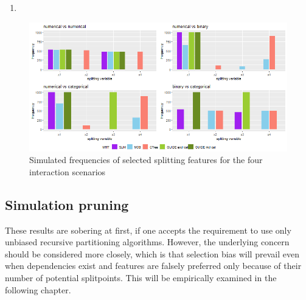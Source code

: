 \begin{enumerate}
    \item 
\end{enumerate}


\begin{figure}
    \centering   
    \includegraphics[width = 16cm]{Figures/simulations/batchtools/selection_bias_general/interactions.png}
    \caption{Simulated frequencies of selected splitting features for the four interaction scenarios}
    \label{fig:selection_bias_interactions}
\end{figure}



\subsection{Simulation pruning}
These results are sobering at first, if one accepts the requirement to use only unbiased recursive partitioning algorithms. However, the underlying concern should be considered more closely, which is that selection bias will prevail even when dependencies exist and features are falsely preferred only because of their number of potential splitpoints.
This will be empirically examined in the following chapter.


\vspace{1cm}









